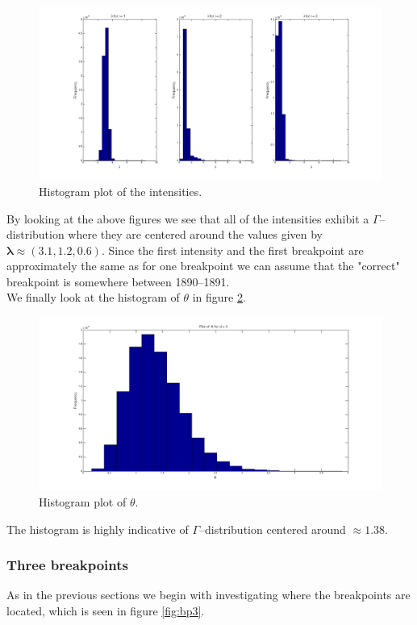 \begin{figure}[H]
\centering
\includegraphics[scale=0.26]{./Figures/lpost2.png}
\caption{Histogram plot of the intensities.}
\label{fig:lpost2}
\end{figure}

By looking at the above figures we see that all of the intensities exhibit a $\Gamma$--distribution where they are centered around the values given by $\boldsymbol{\lambda} \approx (3.1,1.2,0.6)$. Since the first intensity and the first breakpoint are approximately the same as for one breakpoint we can assume that the "correct" breakpoint is somewhere between 1890--1891. \\ We finally look at the histogram of $\theta$ in figure \ref{fig:thetapost2}.

\begin{figure}[H]
\centering
\includegraphics[scale=0.26]{./Figures/thetapost2.png}
\caption{Histogram plot of $\theta$.}
\label{fig:thetapost2}
\end{figure}

The histogram is highly indicative of $\Gamma$--distribution centered around $\approx 1.38$.

\newpage
\subsubsection*{Three breakpoints}
As in the previous sections we begin with investigating where the breakpoints are located, which is seen in figure \ref{fig:bp3}.


